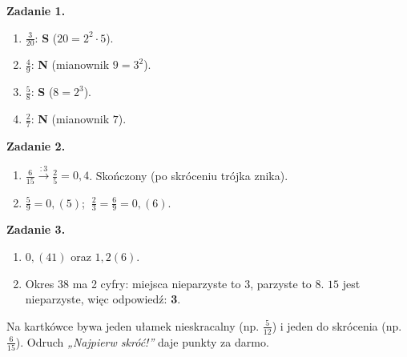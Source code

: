 \documentclass[11pt,a4paper]{article}
\begin{document}

\vspace{0.6em}
\textbf{Zadanie 1.}
\begin{enumerate}[label=\alph*), leftmargin=*, itemsep=4pt]
  \item $\frac{3}{20}$: \textbf{S} ($20=2^2\cdot 5$).
  \item $\frac{4}{9}$: \textbf{N} (mianownik $9=3^2$).
  \item $\frac{5}{8}$: \textbf{S} ($8=2^3$).
  \item $\frac{2}{7}$: \textbf{N} (mianownik $7$).
\end{enumerate}

\textbf{Zadanie 2.}
\begin{enumerate}[label=\alph*), leftmargin=*, itemsep=4pt]
  \item $\frac{6}{15}\xrightarrow{:3}\frac{2}{5}=0{,}4$. Skończony (po skróceniu trójka znika).
  \item $\frac{5}{9}=0{,}(5)$; $\ \frac{2}{3}=\frac{6}{9}=0{,}(6)$.
\end{enumerate}

\textbf{Zadanie 3.}
\begin{enumerate}[label=\alph*), leftmargin=*, itemsep=4pt]
  \item $0{,}(41)$ oraz $1{,}2(6)$.
  \item Okres $38$ ma 2 cyfry: miejsca nieparzyste to $3$, parzyste to $8$. $15$ jest nieparzyste, więc odpowiedź: \textbf{3}.
\end{enumerate}

\vspace{0.6em}
\begin{tcolorbox}[colback=white, colframe=okres, boxrule=0.6pt, arc=2pt, title=Wskazówka dla Pawła]
Na kartkówce bywa jeden ułamek nieskracalny (np. $\frac{5}{12}$) i jeden do skrócenia (np. $\frac{6}{15}$). Odruch \emph{„Najpierw skróć!”} daje punkty za darmo.
\end{tcolorbox}
\end{document}
